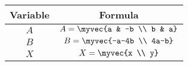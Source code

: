 \begin{center}
    \begin{tabular}{|c|c|} 
        \hline
            \textbf{Variable}  & \textbf{Formula} \\ 
        \hline
            $A$   & $A = \myvec{a & -b \\ b & a}$ \\ 
        \hline
            $B$   &  $B = \myvec{-a-4b \\ 4a-b}$\\ 
        \hline
          $X$   &  $X = \myvec{x \\ y}$\\ 
        \hline
           \end{tabular}
\end{center}  
